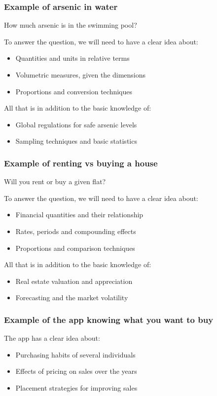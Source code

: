 \documentclass[11pt]{article}
\begin{document}
\subsubsection{Example of arsenic in water}
\label{sec:orgeb8d5bf}
How much arsenic is in the swimming pool?

To answer the question, we will need to have a clear idea about:
\begin{itemize}
\item Quantities and units in relative terms
\item Volumetric measures, given the dimensions
\item Proportions and conversion techniques
\end{itemize}

All that is in addition to the basic knowledge of:
\begin{itemize}
\item Global regulations for safe arsenic levels
\item Sampling techniques and basic statistics
\end{itemize}
\subsubsection{Example of renting vs buying a house}
\label{sec:org7021388}
Will you rent or buy a given flat?

To answer the question, we will need to have a clear idea about:
\begin{itemize}
\item Financial quantities and their relationship
\item Rates, periods and compounding effects
\item Proportions and comparison techniques
\end{itemize}

All that is in addition to the basic knowledge of:
\begin{itemize}
\item Real estate valuation and appreciation
\item Forecasting and the market volatility
\end{itemize}
\subsubsection{Example of the app knowing what you want to buy}
\label{sec:org2e1ff95}
The app has a clear idea about:
\begin{itemize}
\item Purchasing habits of several individuals
\item Effects of pricing on sales over the years
\item Placement strategies for improving sales
\end{itemize}
\end{document}
